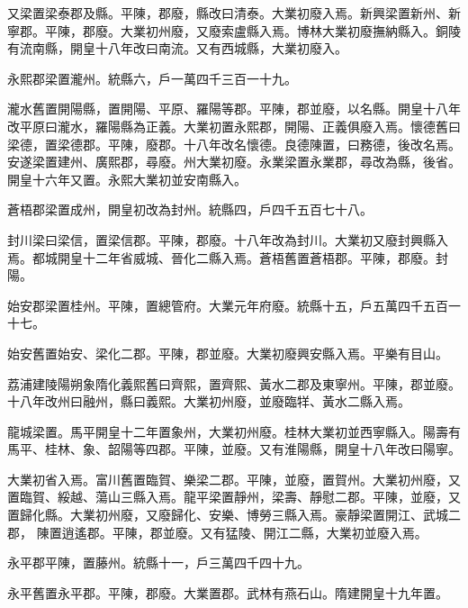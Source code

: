 \begin{pinyinscope}
 又梁置梁泰郡及縣。平陳，郡廢，縣改曰清泰。大業初廢入焉。新興梁置新州、新寧郡。平陳，郡廢。大業初州廢，又廢索盧縣入焉。博林大業初廢撫納縣入。銅陵有流南縣，開皇十八年改曰南流。又有西城縣，大業初廢入。



 永熙郡梁置瀧州。統縣六，戶一萬四千三百一十九。



 瀧水舊置開陽縣，置開陽、平原、羅陽等郡。平陳，郡並廢，以名縣。開皇十八年改平原曰瀧水，羅陽縣為正義。大業初置永熙郡，開陽、正義俱廢入焉。懷德舊曰梁德，置梁德郡。平陳，廢郡。十八年改名懷德。良德陳置，曰務德，後改名焉。安遂梁置建州、廣熙郡，尋廢。州大業初廢。永業梁置永業郡，尋改為縣，後省。開皇十六年又置。永熙大業初並安南縣入。



 蒼梧郡梁置成州，開皇初改為封州。統縣四，戶四千五百七十八。



 封川梁曰梁信，置梁信郡。平陳，郡廢。十八年改為封川。大業初又廢封興縣入焉。都城開皇十二年省威城、晉化二縣入焉。蒼梧舊置蒼梧郡。平陳，郡廢。封陽。



 始安郡梁置桂州。平陳，置總管府。大業元年府廢。統縣十五，戶五萬四千五百一十七。



 始安舊置始安、梁化二郡。平陳，郡並廢。大業初廢興安縣入焉。平樂有目山。



 荔浦建陵陽朔象隋化義熙舊曰齊熙，置齊熙、黃水二郡及東寧州。平陳，郡並廢。十八年改州曰融州，縣曰義熙。大業初州廢，並廢臨䍧、黃水二縣入焉。



 龍城梁置。馬平開皇十二年置象州，大業初州廢。桂林大業初並西寧縣入。陽壽有馬平、桂林、象、韶陽等四郡。平陳，並廢。又有淮陽縣，開皇十八年改曰陽寧。



 大業初省入焉。富川舊置臨賀、樂梁二郡。平陳，並廢，置賀州。大業初州廢，又置臨賀、綏越、蕩山三縣入焉。龍平梁置靜州，梁壽、靜慰二郡。平陳，並廢，又置歸化縣。大業初州廢，又廢歸化、安樂、博勞三縣入焉。豪靜梁置開江、武城二郡，
 陳置逍遙郡。平陳，郡並廢。又有猛陵、開江二縣，大業初並廢入焉。



 永平郡平陳，置藤州。統縣十一，戶三萬四千四十九。



 永平舊置永平郡。平陳，郡廢。大業置郡。武林有燕石山。隋建開皇十九年置。




\end{pinyinscope}
